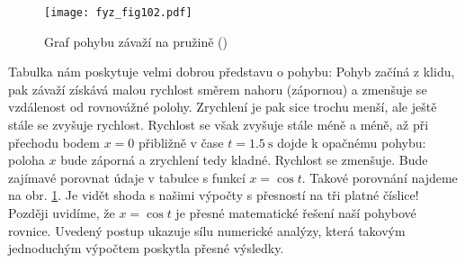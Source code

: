     
    \begin{figure}[ht!]  %
      \centering
      \texttt{[image: fyz\_fig102.pdf]}
      \caption{Graf pohybu závaží na pružině (\cite[s.~129]{Feynman01})}
      \label{fyz:fig102}
    \end{figure}
    
    Tabulka nám poskytuje velmi dobrou představu o pohybu: Pohyb začíná z klidu, pak závaží získává 
    malou rychlost směrem nahoru (zápornou) a zmenšuje se vzdálenost od rovnovážné polohy. 
    Zrychlení je pak sice trochu menší, ale ještě stále se zvyšuje rychlost. Rychlost se však 
    zvyšuje stále méně a méně, až při přechodu bodem \(x = 0\) přibližně v čase \(t = 
    \SI{1.5}{\s}\) dojde k opačnému pohybu: poloha \(x\) bude záporná a zrychlení tedy kladné. 
    Rychlost se zmenšuje. Bude zajímavé porovnat údaje v tabulce s funkcí \(x = \cos t\). Takové 
    porovnání najdeme na obr. \ref{fyz:fig102}. Je vidět shoda s našimi výpočty s přesností na tři 
    platné číslice! Později uvidíme, že \(x = \cos t\) je přesné matematické řešení naší pohybové 
    rovnice. Uvedený postup ukazuje sílu numerické analýzy, která takovým jednoduchým výpočtem 
    poskytla přesné výsledky.
    
